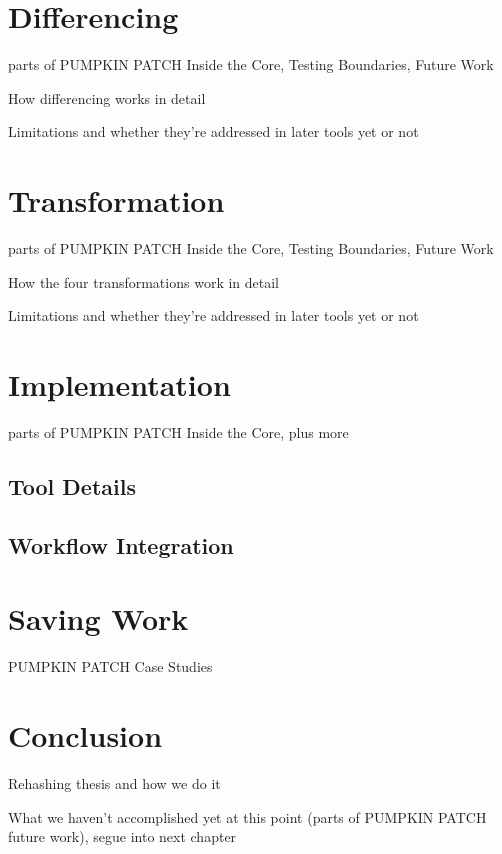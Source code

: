\section{Differencing}

parts of PUMPKIN PATCH Inside the Core, Testing Boundaries, Future Work

How differencing works in detail

Limitations and whether they're addressed in later tools yet or not

\section{Transformation}

parts of PUMPKIN PATCH Inside the Core, Testing Boundaries, Future Work

How the four transformations work in detail

Limitations and whether they're addressed in later tools yet or not

\section{Implementation}

parts of PUMPKIN PATCH Inside the Core, plus more

\subsection{Tool Details}

\subsection{Workflow Integration}

\section{Saving Work}

PUMPKIN PATCH Case Studies

\section{Conclusion}

Rehashing thesis and how we do it

What we haven't accomplished yet at this point (parts of PUMPKIN PATCH future work), segue into next chapter


%

%

%

%

%

%

%

%

